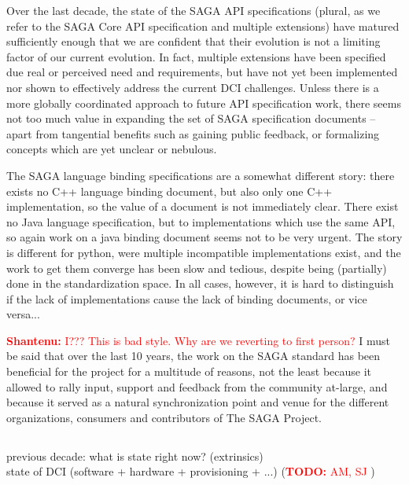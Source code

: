 \documentclass{article}
\newcommand{\B}[1]{\textbf{#1}}
\newcommand{\todo}[1]{{\textcolor{red}{\B{TODO:} #1 }}}
\newcommand{\jhanote}[1]{{\textcolor{red}{     \B{Shantenu:} #1 }}}
\newcommand{\jhanote}[1]{}
\begin{document}
  Over the last decade, the state of the SAGA API specifications
  (plural, as we refer to the SAGA Core API specification and multiple
  extensions) have matured sufficiently enough that we are confident
  that their evolution is not a limiting factor of our current
  evolution.  In fact, multiple extensions have been specified due
  real or perceived need and requirements, but have not yet been
  implemented nor shown to effectively address the current DCI
  challenges.  Unless there is a more globally coordinated approach to
  future API specification work, there seems not too much value in
  expanding the set of SAGA specification documents -- apart from
  tangential benefits such as gaining public feedback, or formalizing
  concepts which are yet unclear or nebulous.

  The SAGA language binding specifications are a somewhat different
  story: there exists no C++ language binding document, but also only
  one C++ implementation, so the value of a document is not
  immediately clear.  There exist no Java language specification, but
  to implementations which use the same API, so again work on a java
  binding document seems not to be very urgent.  The story is
  different for python, were multiple incompatible implementations
  exist, and the work to get them converge has been slow and tedious,
  despite being (partially) done in the standardization space.  In all
  cases, however, it is hard to distinguish if the lack of
  implementations cause the lack of binding documents, or vice
  versa...

  \jhanote{I??? This is bad style. Why are we reverting to first
    person?} I must be said that over the last 10 years, the work on
  the SAGA standard has been beneficial for the project for a
  multitude of reasons, not the least because it allowed to rally
  input, support and feedback from the community at-large, and because
  it served as a natural synchronization point and venue for the
  different organizations, consumers and contributors of The SAGA
  Project.


\subsection{}
 previous decade: what is state right now? (extrinsics)\\
 
state of DCI (software + hardware + provisioning + ...) (\todo{AM, SJ})\\
 
\end{document}
